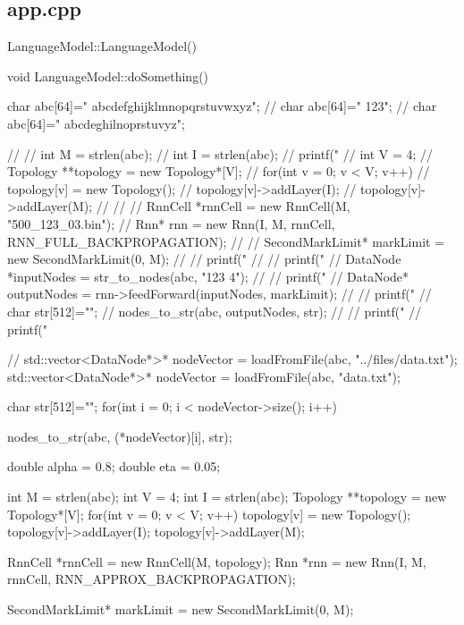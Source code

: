 \subsection{app.cpp}

LanguageModel::LanguageModel(){

}

void LanguageModel::doSomething(){

   char abc[64]=" abcdefghijklmnopqrstuvwxyz";
   // char abc[64]=" 123";
   // char abc[64]=" abcdeghilnoprstuvyz";

  //
  // int M = strlen(abc);
  // int I = strlen(abc);
  // printf("%
  // int V = 4;
  // Topology **topology = new Topology*[V];
  // for(int v = 0; v < V; v++){
  //   topology[v] = new Topology();
  //   topology[v]->addLayer(I);
  //   topology[v]->addLayer(M);
  // }
  //
  // RnnCell *rnnCell = new RnnCell(M, "500\_123\_03.bin");
  // Rnn* rnn = new Rnn(I, M, rnnCell, RNN\_FULL\_BACKPROPAGATION);
  //
  // SecondMarkLimit* markLimit = new SecondMarkLimit(0, M);
  //   // printf("%
  //     // printf("%
  // DataNode *inputNodes = str\_to\_nodes(abc, "123 4");
  //   // printf("%
  // DataNode* outputNodes = rnn->feedForward(inputNodes, markLimit);
  //   // printf("%
  // char str[512]="";
  // nodes\_to\_str(abc, outputNodes, str);
  //
  // printf("%
  // printf("%






  // std::vector<DataNode*>* nodeVector = loadFromFile(abc, "../files/data.txt");
  std::vector<DataNode*>* nodeVector = loadFromFile(abc, "data.txt");



  char str[512]="";
  for(int i = 0; i < nodeVector->size(); i++){
    nodes\_to\_str(abc, (*nodeVector)[i], str);

  }



  double alpha = 0.8;
  double eta = 0.05;

  int M = strlen(abc);
  int V = 4;
  int I = strlen(abc);
  Topology **topology = new Topology*[V];
  for(int v = 0; v < V; v++){
    topology[v] = new Topology();
    topology[v]->addLayer(I);
    topology[v]->addLayer(M);
  }

  RnnCell *rnnCell = new RnnCell(M, topology);
  Rnn *rnn = new Rnn(I, M, rnnCell, RNN\_APPROX\_BACKPROPAGATION);

  SecondMarkLimit* markLimit = new SecondMarkLimit(0, M);

}
